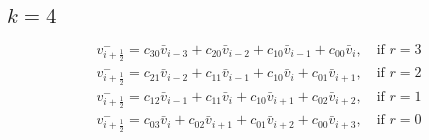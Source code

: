 \documentclass{article}
\begin{document}
\subsection*{$k=4$}
\begin{equation}
\begin{array}{l}
\displaystyle v_{i+\frac{1}{2}}^{-} = c_{30} \bar{v}_{i-3} + c_{20} \bar{v}_{i-2} + c_{10} \bar{v}_{i-1} + c_{00} \bar{v}_{i}, \quad \text{if } r = 3 \\
\displaystyle v_{i+\frac{1}{2}}^{-} = c_{21} \bar{v}_{i-2} + c_{11} \bar{v}_{i-1} + c_{10} \bar{v}_{i} + c_{01} \bar{v}_{i+1}, \quad \text{if } r = 2 \\
\displaystyle v_{i+\frac{1}{2}}^{-} = c_{12} \bar{v}_{i-1} + c_{11} \bar{v}_{i} + c_{10} \bar{v}_{i+1} + c_{02} \bar{v}_{i+2}, \quad \text{if } r = 1 \\
\displaystyle v_{i+\frac{1}{2}}^{-} = c_{03} \bar{v}_{i} + c_{02} \bar{v}_{i+1} + c_{01} \bar{v}_{i+2} + c_{00} \bar{v}_{i+3}, \quad \text{if } r = 0
\end{array}
\end{equation}
\end{document}

